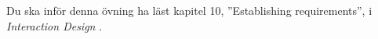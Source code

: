 Du ska inför denna övning ha läst kapitel 10, 
''\foreignlanguage{english}{Establishing requirements}'', i \emph{Interaction 
Design} \citep{Sharp2011idb}.
